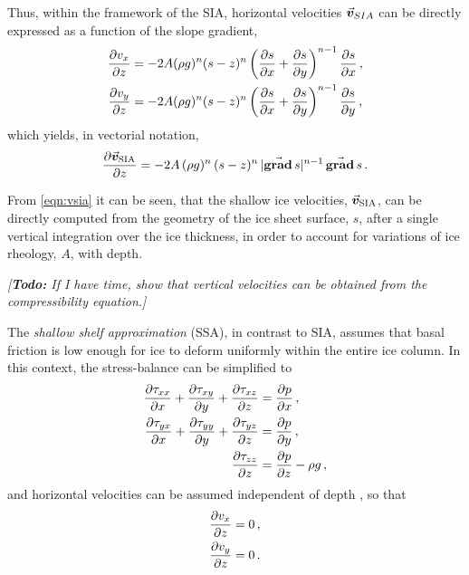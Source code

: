 \documentclass{article}
\newcommand{\todo}[1]{\emph{[\textbf{Todo:} #1]}}
\newcommand{\vect}[1]{\va*{#1}} %
\renewcommand{\grad}[1]{\vect{\mathrm{grad}}\,#1}   %
\newcommand{\vv}[0]{\vect{v}}           %
\newcommand{\vsia}[0]{\vv_{\mathrm{SIA}}}   %
\begin{document}
Thus, within the framework of the SIA, horizontal velocities $\vv_{SIA}$ can be
directly expressed as a function of the slope gradient,
\begin{subequations}
\begin{align}
    \pdv{v_x}{z} &= -2A (\rho g)^n (s-z)^n
                    \left(\pdv{s}{x}+\pdv{s}{y}\right)^{n-1} \pdv{s}{x} \,, \\
    \pdv{v_y}{z} &= -2A (\rho g)^n (s-z)^n
                    \left(\pdv{s}{x}+\pdv{s}{y}\right)^{n-1} \pdv{s}{y} \,,
\end{align}
\end{subequations}
which yields, in vectorial notation,
\begin{equation}
    \label{eqn:vsia}
    \pdv{\vsia}{z} = -2A\,(\rho g)^n\,(s-z)^n\,|\grad{s}|^{n-1}\,\grad{s} \,.
\end{equation}

From \cref{eqn:vsia} it can be seen, that the shallow ice velocities, $\vsia$,
can be directly computed from the geometry of the ice sheet surface, $s$,
after a single vertical integration over the ice thickness, in order to
account for variations of ice rheology, $A$, with depth.

\todo{If I have time, show that vertical velocities can be
      obtained from the compressibility equation.}

The \emph{shallow shelf approximation} (SSA), in contrast to SIA, assumes that
basal friction is low enough for ice to deform uniformly within the entire ice
column. In this context, the stress-balance can
be simplified to \citep[Eqs.~4.10--4.12]{Weis.etal.1999}
\begin{subequations}
\label{eqn:ssa}
\begin{align}
    \label{eqn:ssax}
    \pdv{\tau_{xx}}{x} + \pdv{\tau_{xy}}{y} + \pdv{\tau_{xz}}{z}
        &= \pdv{p}{x} \,, \\
    \label{eqn:ssay}
    \pdv{\tau_{yx}}{x} + \pdv{\tau_{yy}}{y} + \pdv{\tau_{yz}}{z}
        &= \pdv{p}{y} \,, \\
    \label{eqn:ssaz}
    \pdv{\tau_{zz}}{z} &= \pdv{p}{z} - \rho g \,,
\end{align}
\end{subequations}
and horizontal velocities can be assumed independent of depth
\citep[Eq.~4.22]{Weis.etal.1999}, so that
\begin{align}
    \pdv{v_x}{z} &= 0 \,, \\
    \pdv{v_y}{z} &= 0 \,.
\end{align}
\end{document}
